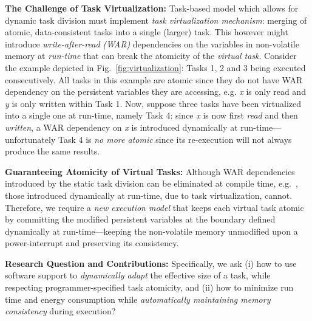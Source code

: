 \textbf{The Challenge of Task Virtualization:} Task-based model which allows for dynamic task division must implement \emph{task virtualization mechanism}: merging of atomic, data-consistent tasks into a single (larger) task. This however might introduce \emph{write-after-read (WAR)} dependencies on the variables in non-volatile memory at \emph{run-time} that can break the atomicity of the \emph{virtual task}. Consider the example depicted in Fig.~\ref{fig:virtualization}: Tasks 1, 2 and 3 being executed consecutively. All tasks in this example are atomic since they do not have WAR dependency on the persistent variables they are accessing, e.g. \emph{x} is only read and \emph{y} is only written within Task 1. Now, suppose three tasks have been virtualized into a single one at run-time, namely Task 4: since \emph{x} is now first \emph{read} and then \emph{written}, a WAR dependency on \emph{x} is introduced dynamically at run-time---unfortunately Task 4 is \emph{no more atomic} since its re-execution will not always produce the same results.

\textbf{Guaranteeing Atomicity of Virtual Tasks:} Although WAR dependencies introduced by the static task division can be eliminated at compile time, e.g.~\cite{alpaca}, those introduced dynamically at run-time, due to task virtualization, cannot. Therefore, we require a \emph{new execution model} that keeps each virtual task atomic by committing the modified persistent variables at the boundary defined dynamically at run-time---keeping the non-volatile memory unmodified upon a power-interrupt and preserving its consistency.


\textbf{Research Question and Contributions:} Specifically, we ask (i) how to use software support to \emph{dynamically adapt} the effective size of a task, while respecting programmer-specified task atomicity, and (ii) how to minimize run time and energy consumption while \emph{automatically maintaining memory consistency} during execution?


